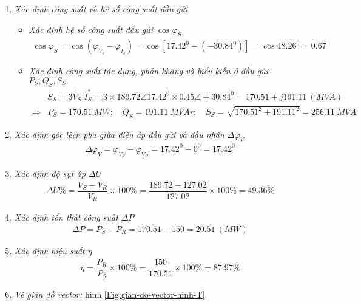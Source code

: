 \documentclass[12pt,a4paper]{article}
\newcommand{\unit}[1]{~#1}
\newcommand{\unitp}[1]{~\left({#1}\right)}
\newcommand{\pfm}[1]{\left({#1}\right)}
\begin{document}
\begin{enumerate}[ \it a. ]
		\item \emph{Xác định công suất và hệ số công suất đầu gửi}
			\begin{itemize}
				\item \emph{Xác định hệ số công suất đầu gửi $\cos \varphi_S$}
					\begin{align*}
						\cos \varphi_S = \cos \pfm{\varphi_{V_s} - \varphi_{I_{s}}}= \cos \left[{17.42^0 - \pfm{-30.84^0}} \right] = \cos 48.26^0 = 0.67
					\end{align*}

				\item \emph{Xác định công suất tác dụng, phản kháng và biểu kiến ở đầu gửi $P_S, Q_S, S_S$}
					\begin{align*}
						&\overline{S}_S = 3 \overline{V}_S.\overline{I}_S^{\ast} = 3 \times 189.72 \angle 17.42^0 \times 0.45 \angle +30.84^0 = 170.51 + j191.11 \unitp{MVA}\\
						\Longrightarrow & P_S = 170.51 \unit{MW}; \quad Q_S = 191.11 \unit{MVAr}; \quad S_S = \sqrt{170.51^2 + 191.11^2} = 256.11 \unit{MVA}
					\end{align*}
			\end{itemize}

		\item \emph{Xác định góc lệch pha giữa điện áp đầu gửi và đầu nhận $\Delta \varphi_V$}
			\begin{align*}
				\Delta \varphi_V = \varphi_{V_S} - \varphi_{V_R} = 17.42^0 - 0^0 = 17.42^0
			\end{align*}

		\item \emph{Xác định độ sụt áp $\Delta U$}
			\begin{align*}
				\Delta U \%= \dfrac{V_S - V_R}{V_R} \times 100 \% = \dfrac{189.72 - 127.02}{127.02} \times 100 \% = 49.36\%
			\end{align*}

		\item \emph{Xác định tổn thất công suất $\Delta P$}
			\begin{align*}
				\Delta P = P_S - P_R = 170.51 - 150 = 20.51 \unitp{MW}
			\end{align*}

		\item \emph{Xác định hiệu suất $\eta$}
			\begin{align*}
				\eta = \dfrac{P_R}{P_S} \times 100 \% = \dfrac{150}{170.51} \times 100\% = 87.97\%
			\end{align*}

		\item \emph{Vẽ giản đồ vector:} hình \ref{Fig:gian-do-vector-hinh-T}.
			\begin{figure}[!h]
				\begin{center}
\end{center}
\end{figure}
\end{enumerate}
\end{document}
